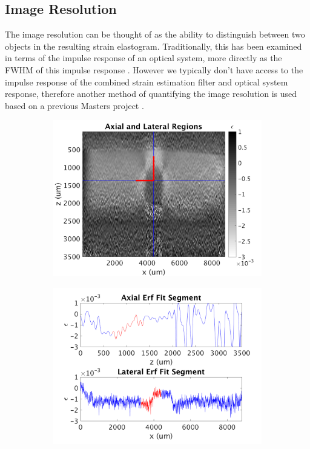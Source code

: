 \subsection{Image Resolution}
The image resolution can be thought of as the ability to distinguish between two objects in the resulting strain elastogram. Traditionally, this has been examined in terms of the impulse response of an optical system, more directly as the FWHM of this impulse response \cite{reynolds_resolution_1989}. However we typically don't have access to the impulse response of the combined strain estimation filter and optical system response, therefore another method of quantifying the image resolution is used based on a previous Masters project \cite{hepburn_improving_2017}.

\begin{figure}[t]
	\centering
	\begin{subfigure}{0.49\textwidth}
		\centering
		\includegraphics[width=\textwidth]{figures/image_res_regions.png}
	\end{subfigure}
	\begin{subfigure}{0.49\textwidth}
		\centering
		\includegraphics[width=\textwidth]{figures/lateral_axial_segments.png}

\end{subfigure}
\end{figure}
